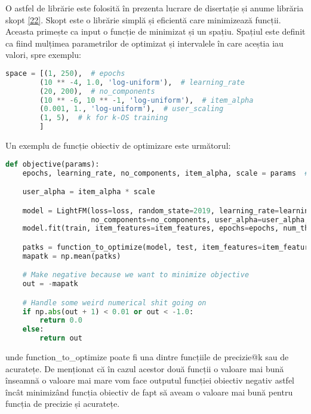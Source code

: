 O astfel de librărie este folosită în prezenta lucrare de disertație și anume librăria skopt \hyperlink{skopt}{[22]}. Skopt este o librărie simplă și eficientă care minimizează funcții. Aceasta primește ca input o funcție de minimizat și un spațiu. Spațiul este definit ca fiind mulțimea parametrilor de optimizat și intervalele în care aceștia iau valori, spre exemplu:
\begin{lstlisting}[language=Python, caption=Spațiul parametrilor de optimizat]
space = [(1, 250),  # epochs
        (10 ** -4, 1.0, 'log-uniform'),  # learning_rate
        (20, 200),  # no_components
        (10 ** -6, 10 ** -1, 'log-uniform'),  # item_alpha
        (0.001, 1., 'log-uniform'),  # user_scaling
        (1, 5),  # k for k-OS training
        ] 
\end{lstlisting}

Un exemplu de funcție obiectiv de optimizare este următorul:
\begin{lstlisting}[language=Python, caption=Funcție obiectiv de minimizat]
def objective(params):
    epochs, learning_rate, no_components, item_alpha, scale = params  # 'k_os'

    user_alpha = item_alpha * scale

    model = LightFM(loss=loss, random_state=2019, learning_rate=learning_rate,
                    no_components=no_components, user_alpha=user_alpha, item_alpha=item_alpha)
    model.fit(train, item_features=item_features, epochs=epochs, num_threads=threads, verbose=True)

    patks = function_to_optimize(model, test, item_features=item_features, num_threads=threads)
    mapatk = np.mean(patks)

    # Make negative because we want to minimize objective
    out = -mapatk

    # Handle some weird numerical shit going on
    if np.abs(out + 1) < 0.01 or out < -1.0:
        return 0.0
    else:
        return out
\end{lstlisting}
unde function\_to\_optimize poate fi una dintre funcțiile de precizie@k sau de acuratețe. De menționat că în cazul acestor două funcții o valoare mai bună înseamnă o valoare mai mare vom face outputul funcției obiectiv negativ astfel încât minimizând funcția obiectiv de fapt să aveam o valoare mai bună pentru funcția de precizie și acuratețe.


